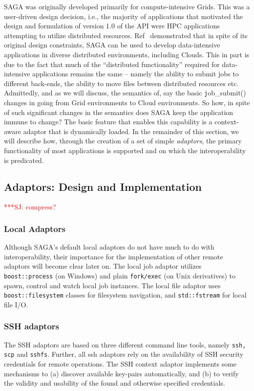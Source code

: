 \documentclass[3p,twocolumn]{elsarticle}
\newcommand{\jhanote}[1]{ {\textcolor{red} { ***SJ: #1 }}}
\newcommand{\jhanote}[1]{}
\newcommand{\upup}{\vspace*{-0.6em}}
\newcommand{\T}[1]{\texttt{#1}}
\begin{document}
SAGA was originally developed primarily for compute-intensive
Grids. This was a user-driven design decision, i.e., the majority of
applications that motivated the design and formulation of version 1.0
of the API were HPC applications attempting to utilize distributed
resources.  Ref~\cite{saga_ccgrid09} demonstrated that in spite of its
original design constraints, SAGA can be used to develop
data-intensive applications in diverse distributed environments,
including Clouds.  This in part is due to the fact that much of the
``distributed functionality'' required for data-intensive applications
remains the same -- namely the ability to submit jobs to different
back-ends, the ability to move files between distributed resources
etc. Admittedly, and as we will discuss, the semantics of, say the
basic {\texttt job\_submit()} changes in going from Grid environments
to Cloud environments.  So how, in spite of such significant changes
in the semantics does SAGA keep the application immune to change? The
basic feature that enables this capability is a context-aware adaptor
that is dynamically loaded.  In the remainder of this section, we will
describe how, through the creation of a set of simple {\it adaptors},
the primary functionality of most applications is supported and on
which the interoperability is predicated.

\upup
\subsection{Adaptors: Design and Implementation}

\jhanote{compress?}

\subsubsection{Local Adaptors}
Although SAGA's default local adaptors do not have much to do with
interoperability, their importance for the implementation of other
remote adaptors will become clear later on.  The local job adaptor
utilizes \T{boost::process} (on Windows) and plain \T{fork/exec} (on
Unix derivatives) to spawn, control and watch local job instances.  The
local file adaptor uses \T{boost::filesystem} classes for filesystem
navigation, and \T{std::fstream} for local file I/O. %

\subsubsection{SSH adaptors}
The SSH adaptors are based on three different command line tools,
namely {\texttt{ssh, scp}} and {\texttt{sshfs}}.  Further, all ssh
adaptors rely on the availability of SSH security credentials for
remote operations.  The SSH context adaptor implements some mechanisms
to (a) discover available key-pairs automatically, and (b) to verify
the validity and usability of the found and otherwise specified
credentials.
  
\end{document}
